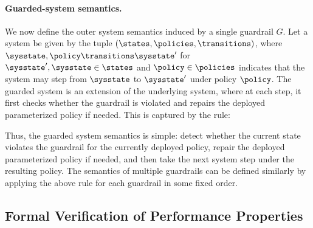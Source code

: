 \paragraph{Guarded-system semantics.}
We now define the outer system semantics induced by a single guardrail $G$.
Let a system be given by the tuple $(\states,\policies,\transitions)$, where $\sysstate, \policy \transitions \sysstate'$ for $\sysstate',\sysstate \in \states$ and $\policy \in \policies$ indicates that the system may step from $\sysstate$ to $\sysstate'$ under policy $\policy$.
The guarded system is an extension of the underlying system, where at each step, it first checks whether the guardrail is violated and repairs the deployed parameterized policy if needed.
This is captured by the rule:
\begin{mathpar}
\end{mathpar}
Thus, the guarded system semantics is simple: detect whether the current state violates the guardrail for the currently deployed policy, repair the deployed parameterized policy if needed, and then take the next system step under the resulting policy. The semantics of multiple guardrails can be defined similarly by applying the above rule for each guardrail in some fixed order.


\subsection{Formal Verification of Performance Properties}
\label{subsec:verification-conditions}


